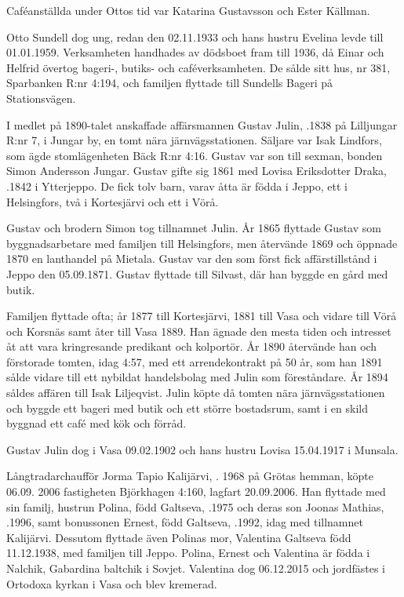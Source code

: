 Caféanställda under Ottos tid var Katarina Gustavsson och Ester Källman.

Otto Sundell dog ung, redan den 02.11.1933 och hans hustru Evelina levde till 01.01.1959. Verksamheten handhades av dödsboet fram till 1936, då Einar och	Helfrid övertog bageri-, butiks- och caféverksamheten. De sålde sitt hus, nr 381, Sparbanken R:nr 4:194, och familjen flyttade till Sundells Bageri på Stationsvägen.


I medlet på 1890-talet anskaffade affärsmannen Gustav Julin, .1838 på Lilljungar R:nr 7, i Jungar by, en tomt nära järnvägsstationen. Säljare var Isak Lindfors, som ägde stomlägenheten Bäck R:nr 4:16. Gustav var son till sexman, bonden Simon Andersson Jungar. Gustav gifte sig 1861 med Lovisa Eriksdotter Draka, .1842 i Ytterjeppo. De fick tolv barn, varav åtta är födda i Jeppo, ett i Helsingfors, två i Kortesjärvi och ett i Vörå.

Gustav och brodern Simon tog tillnamnet Julin. År 1865 flyttade Gustav som byggnadsarbetare med familjen till Helsingfors, men återvände 1869 och öppnade 1870 en lanthandel på Mietala. Gustav var den som först fick affärstillstånd i Jeppo den 05.09.1871. Gustav flyttade till Silvast, där han byggde en gård med butik.

Familjen flyttade ofta; år 1877 till Kortesjärvi, 1881 till Vasa och vidare till Vörå och Korsnäs samt åter till Vasa 1889. Han ägnade den mesta tiden och intresset åt att vara kringresande predikant	och kolportör. År 1890 återvände han och förstorade tomten, idag 4:57,	med ett arrendekontrakt på 50 år, som han 1891 sålde vidare till ett nybildat handelsbolag med Julin som föreståndare. År 1894 såldes affären till Isak Liljeqvist. Julin köpte då tomten nära järnvägsstationen och byggde ett bageri med butik och ett större bostadsrum, samt i en skild byggnad ett café med kök och förråd.

Gustav Julin dog i Vasa 09.02.1902 och hans hustru Lovisa 15.04.1917 i Munsala.






Långtradarchaufför Jorma Tapio Kalijärvi, . 1968 på Grötas hemman, köpte 06.09. 2006 fastigheten Björkhagen 4:160, lagfart 20.09.2006. Han flyttade med sin familj, hustrun Polina, född Galtseva, .1975 och deras son Joonas Mathias, .1996, samt bonussonen Ernest, född Galtseva, .1992, idag med tillnamnet Kalijärvi. Dessutom flyttade även Polinas mor, Valentina Galtseva  född 11.12.1938, med familjen till Jeppo. Polina, Ernest och Valentina är födda i Nalchik, Gabardina baltchik i Sovjet. Valentina dog 06.12.2015 och jordfästes i Ortodoxa kyrkan i Vasa och blev kremerad.

